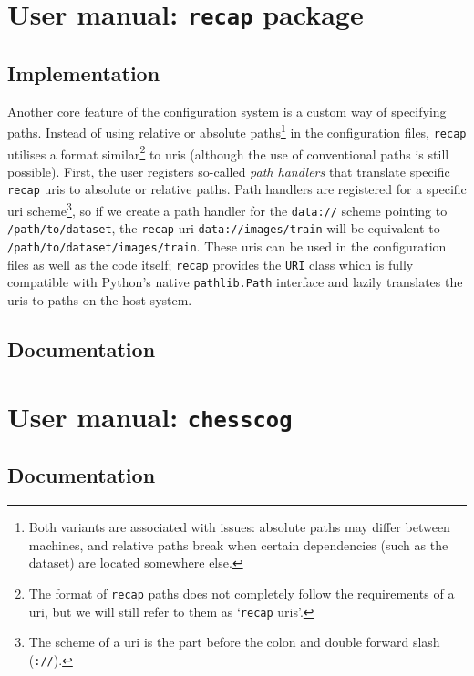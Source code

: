 \documentclass[../../main.tex]{subfiles}
\begin{document}
\chapter{User manual: \texttt{recap} package}
\label{chap:user_man_recap}
\section{Implementation}
\label{sec:user_man_recap_implementation}
Another core feature of the configuration system is a custom way of specifying paths.
Instead of using relative or absolute paths\footnote{Both variants are associated with issues: absolute paths may differ between machines, and relative paths break when certain dependencies (such as the dataset) are located somewhere else.} in the configuration files, \texttt{recap} utilises a format similar\footnote{The format of \texttt{recap} paths does not completely follow the requirements of a \gls{uri}, but we will still refer to them as `\texttt{recap} \glspl{uri}'.} to \glspl{uri} (although the use of conventional paths is still possible).
First, the user registers so-called \emph{path handlers} that translate specific \texttt{recap} \glspl{uri} to absolute or relative paths.
Path handlers are registered for a specific \gls{uri} scheme\footnote{The scheme of a \gls{uri} is the part before the colon and double forward slash (\texttt{://}).}, so if we create a path handler for the \texttt{data://} scheme pointing to \texttt{/path/to/dataset}, the \texttt{recap} \gls{uri} \texttt{data://images/train} will be equivalent to \texttt{/path/to/dataset/images/train}.
These \glspl{uri} can be used in the configuration files as well as the code itself; 
\texttt{recap} provides the \texttt{URI} class which is fully compatible with Python's native \texttt{pathlib.Path} interface and lazily translates the \glspl{uri} to paths on the host system.

\todo{}

\section{Documentation}
\label{sec:recap_documentation}
\todo{}

\chapter{User manual: \texttt{chesscog}}
\label{chap:user_man_chesscog}

\section{Documentation}
\label{sec:chesscog_documentation}
\todo{}
\end{document}
